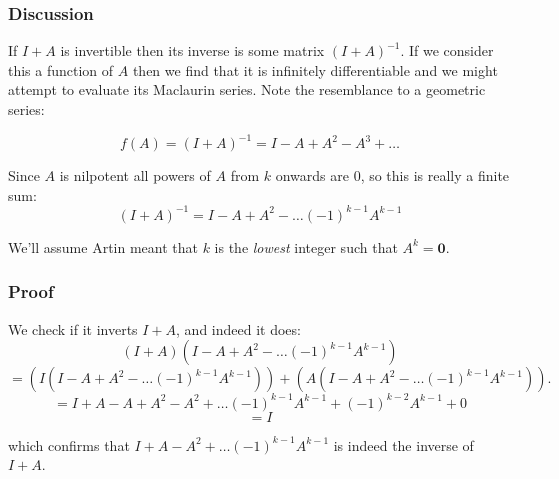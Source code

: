 \documentclass[main.tex]{subfiles}
\begin{document}
\subsubsection*{Discussion} If $I + A$ is invertible then its inverse is some matrix $(I + A)^{-1}$. If we consider this a function of $A$ then we find that it is infinitely differentiable and we might attempt to evaluate its Maclaurin series. Note the resemblance to a geometric series:

$$f(A) = (I + A)^{-1} = I - A + A^2 - A^3 + \ldots$$


Since $A$ is nilpotent all powers of $A$ from $k$ onwards are 0, so this is really a finite sum:
$$(I+A)^{-1} = I - A + A^2 - \ldots (-1)^{k-1}A^{k-1}$$

We'll assume Artin meant that $k$ is the \textit{lowest} integer such that $A^k = \mathbf{0}$.

\subsubsection*{Proof}
We check if it inverts $I + A$, and indeed it does:
$$(I + A)(I - A + A^2 - \ldots (-1)^{k-1}A^{k-1})$$
$$= \left(I(I - A + A^2 - \ldots (-1)^{k-1}A^{k-1})\right)+ \left(A(I - A + A^2 - \ldots (-1)^{k-1}A^{k-1})\right).$$
$$=I + A - A + A^2 - A^2 + \ldots (-1)^{k-1}A^{k-1} + (-1)^{k-2}A^{k-1} + 0$$
$$ = I$$

which confirms that $I + A - A^2 + \ldots (-1)^{k-1}A^{k-1}$ is indeed the inverse of $I + A$.
\end{document}
